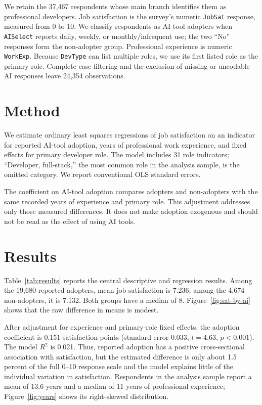 \documentclass[11pt]{article}
\begin{document}
We retain the 37,467 respondents whose main branch identifies them as
professional developers. Job satisfaction is the survey's numeric
\texttt{JobSat} response, measured from 0 to 10. We classify respondents as AI
tool adopters when \texttt{AISelect} reports daily, weekly, or monthly/infrequent
use; the two ``No'' responses form the non-adopter group. Professional
experience is numeric \texttt{WorkExp}. Because \texttt{DevType} can list
multiple roles, we use its first listed role as the primary role. Complete-case
filtering and the exclusion of missing or uncodable AI responses leave 24,354
observations.

\section{Method}
We estimate ordinary least squares regressions of job satisfaction on an
indicator for reported AI-tool adoption, years of professional work experience,
and fixed effects for primary developer role. The model includes 31 role
indicators; ``Developer, full-stack,'' the most common role in the analysis
sample, is the omitted category. We report conventional OLS standard errors.

The coefficient on AI-tool adoption compares adopters and non-adopters with the
same recorded years of experience and primary role. This adjustment addresses
only those measured differences. It does not make adoption exogenous and should
not be read as the effect of using AI tools.

\section{Results}
Table~\ref{tab:results} reports the central descriptive and regression results.
Among the 19,680 reported adopters, mean job satisfaction is 7.236; among the
4,674 non-adopters, it is 7.132. Both groups have a median of 8. Figure~\ref{fig:sat-by-ai}
shows that the raw difference in means is modest.

After adjustment for experience and primary-role fixed effects, the adoption
coefficient is 0.151 satisfaction points (standard error 0.033, $t=4.63$,
$p<0.001$). The model $R^2$ is 0.021. Thus, reported adoption has a positive
cross-sectional association with satisfaction, but the estimated difference is
only about 1.5 percent of the full 0--10 response scale and the model explains
little of the individual variation in satisfaction. Respondents in the analysis
sample report a mean of 13.6 years and a median of 11 years of professional
experience; Figure~\ref{fig:years} shows its right-skewed distribution.
\end{document}
